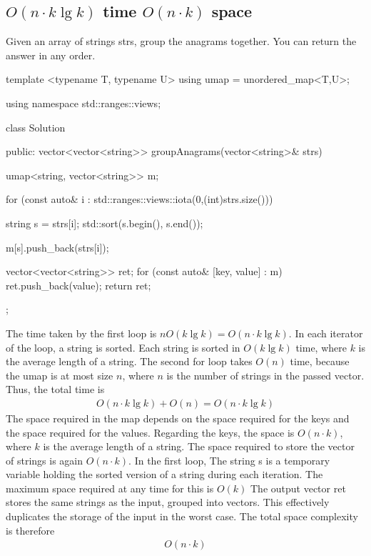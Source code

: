 \documentclass{report}
\begin{document}
    \subsection{$O(n \cdot k\lg k)$ time $O(n\cdot k)$ space}
    \bigbreak \noindent 
    Given an array of strings strs, group the anagrams together. You can return the answer in any order.
    \bigbreak \noindent 
    \begin{cppcode}
        template <typename T, typename U>
        using umap =  unordered_map<T,U>; 

        using namespace std::ranges::views;

        class Solution {
            public:
            vector<vector<string>> groupAnagrams(vector<string>& strs) {
                umap<string, vector<string>> m;

                for (const auto& i : std::ranges::views::iota(0,(int)strs.size())) {
                    string s = strs[i];
                    std::sort(s.begin(), s.end());

                    m[s].push_back(strs[i]);
                }

                vector<vector<string>> ret;
                for (const auto& [key, value] : m) {
                    ret.push_back(value); 
                }
                return ret;
            }
        };
    \end{cppcode}
    \bigbreak \noindent 
    The time taken by the first loop is $nO(k\lg k) = O(n \cdot k\lg k)$. In each iterator of the loop, a string is sorted. Each string is sorted in $O(k \lg k)$ time, where $k$ is the average length of a string. The second for loop takes $O(n)$ time, because the umap is at most size $n$, where $n$ is the number of strings in the passed vector. Thus, the total time is
    \begin{align*}
        O(n \cdot k\lg k) + O(n) = O(n \cdot k\lg k)
    \end{align*}
    \bigbreak \noindent 
    The space required in the map depends on the space required for the keys and the space required for the values. Regarding the keys, the space is $O(n \cdot k)$, where $k$ is the average length of a string. The space required to store the vector of strings is again $O(n \cdot k)$. In the first loop, The string s is a temporary variable holding the sorted version of a string during each iteration. The maximum space required at any time for this is $O(k)$ 
    \bigbreak \noindent 
    The output vector ret stores the same strings as the input, grouped into vectors. This effectively duplicates the storage of the input in the worst case. The total space complexity is therefore
    \begin{align*}
        O(n \cdot k)
    \end{align*}




    
\end{document}
